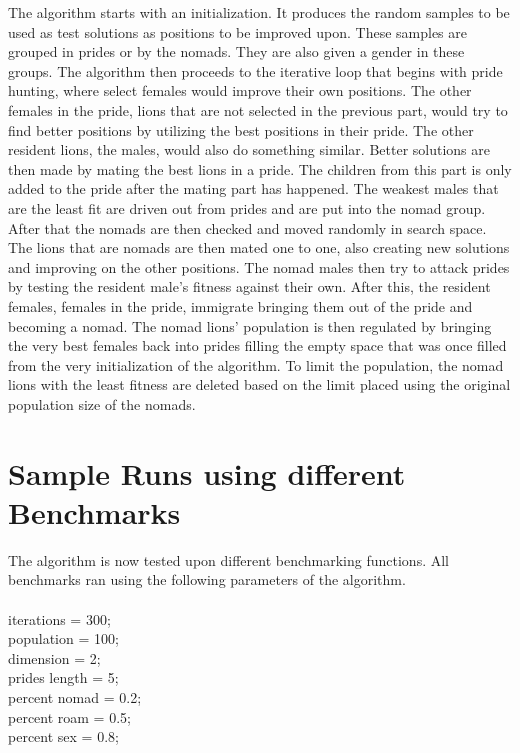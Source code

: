 The algorithm starts with an initialization. It produces the random samples to be used as test solutions as positions to be improved upon. These samples are grouped in prides or by the nomads. They are also given a gender in these groups. The algorithm then proceeds to the iterative loop that begins with pride hunting, where select females would improve their own positions. The other females in the pride, lions that are not selected in the previous part, would try to find better positions by utilizing the best positions in their pride. The other resident lions, the males, would also do something similar. Better solutions are then made by mating the best lions in a pride. The children from this part is only added to the pride after the mating part has happened. The weakest males that are the least fit are driven out from prides and are put into the nomad group. After that the nomads are then checked and moved randomly in search space. The lions that are nomads are then mated one to one, also creating new solutions and improving on the other positions. The nomad males then try to attack prides by testing the resident male's fitness against their own. After this, the resident females, females in the pride, immigrate bringing them out of the pride and becoming a nomad. The nomad lions' population is then regulated by bringing the very best females back into prides filling the empty space that was once filled from the very initialization of the algorithm. To limit the population, the nomad lions with the least fitness are deleted based on the limit placed using the original population size of the nomads.

\section{Sample Runs using different Benchmarks}
The algorithm is now tested upon different benchmarking functions. All benchmarks ran using the following parameters of the algorithm.
\\
\\
iterations = 300;\\

population = 100;\\

dimension = 2;\\

prides length = 5;\\

percent nomad = 0.2;\\
percent roam = 0.5;\\
percent sex = 0.8;\\

